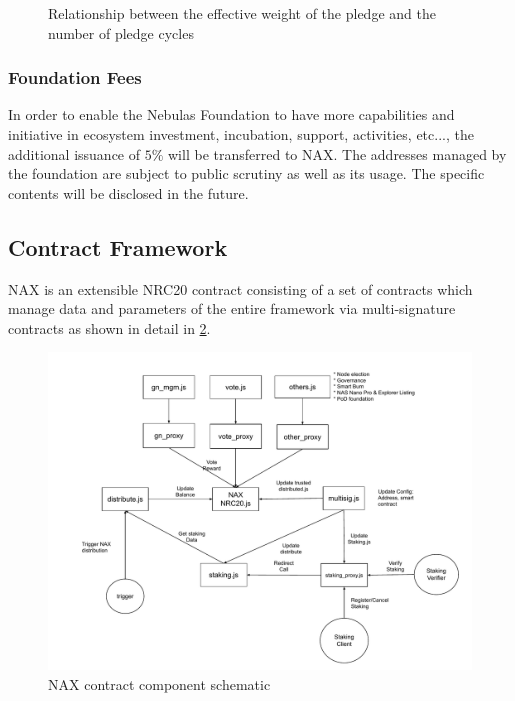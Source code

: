 \begin{figure}
\centering
    \caption{Relationship between the effective weight of the pledge and the number of pledge cycles}\label{weight}
\end{figure}

\subsubsection{Foundation Fees}
In order to enable the Nebulas Foundation to have more capabilities and initiative in ecosystem investment, incubation, support, activities, etc..., the additional issuance of $5\%$ will be transferred to NAX. The addresses managed by the foundation are subject to public scrutiny as well as its usage. The specific contents will be disclosed in the future.

\subsection{Contract Framework}
NAX is an extensible NRC20 contract consisting of a set of contracts which manage data and parameters of the entire framework via multi-signature contracts as shown in detail in \ref{fig:nax_framework}.

\begin{figure}[http]
  \centering
    \includegraphics[width=1\textwidth]{../common/nax.pdf}
    \caption{NAX contract component schematic \label{fig:nax_framework}}
\end{figure}
